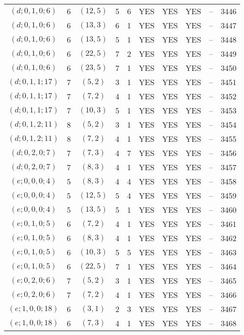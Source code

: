 \begin{longtable}{|c|c|c|c|c|c|c|c|c|c|}
$(d; 0, 1, 0; 6)$ & 6 & $(12, 5)$ & 5 & 6 & YES & YES & YES & -- & 3446\\
$(d; 0, 1, 0; 6)$ & 6 & $(13, 3)$ & 6 & 1 & YES & YES & YES & -- & 3447\\
$(d; 0, 1, 0; 6)$ & 6 & $(13, 5)$ & 5 & 1 & YES & YES & YES & -- & 3448\\
$(d; 0, 1, 0; 6)$ & 6 & $(22, 5)$ & 7 & 2 & YES & YES & YES & -- & 3449\\
$(d; 0, 1, 0; 6)$ & 6 & $(23, 5)$ & 7 & 1 & YES & YES & YES & -- & 3450\\
$(d; 0, 1, 1; 17)$ & 7 & $(5, 2)$ & 3 & 1 & YES & YES & YES & -- & 3451\\
$(d; 0, 1, 1; 17)$ & 7 & $(7, 2)$ & 4 & 1 & YES & YES & YES & -- & 3452\\
$(d; 0, 1, 1; 17)$ & 7 & $(10, 3)$ & 5 & 1 & YES & YES & YES & -- & 3453\\
$(d; 0, 1, 2; 11)$ & 8 & $(5, 2)$ & 3 & 1 & YES & YES & YES & -- & 3454\\
$(d; 0, 1, 2; 11)$ & 8 & $(7, 2)$ & 4 & 1 & YES & YES & YES & -- & 3455\\
$(d; 0, 2, 0; 7)$ & 7 & $(7, 3)$ & 4 & 7 & YES & YES & YES & -- & 3456\\
$(d; 0, 2, 0; 7)$ & 7 & $(8, 3)$ & 4 & 1 & YES & YES & YES & -- & 3457\\
$(e; 0, 0, 0; 4)$ & 5 & $(8, 3)$ & 4 & 4 & YES & YES & YES & -- & 3458\\
$(e; 0, 0, 0; 4)$ & 5 & $(12, 5)$ & 5 & 4 & YES & YES & YES & -- & 3459\\
$(e; 0, 0, 0; 4)$ & 5 & $(13, 5)$ & 5 & 1 & YES & YES & YES & -- & 3460\\
$(e; 0, 1, 0; 5)$ & 6 & $(7, 2)$ & 4 & 1 & YES & YES & YES & -- & 3461\\
$(e; 0, 1, 0; 5)$ & 6 & $(8, 3)$ & 4 & 1 & YES & YES & YES & -- & 3462\\
$(e; 0, 1, 0; 5)$ & 6 & $(10, 3)$ & 5 & 5 & YES & YES & YES & -- & 3463\\
$(e; 0, 1, 0; 5)$ & 6 & $(22, 5)$ & 7 & 1 & YES & YES & YES & -- & 3464\\
$(e; 0, 2, 0; 6)$ & 7 & $(5, 2)$ & 3 & 1 & YES & YES & YES & -- & 3465\\
$(e; 0, 2, 0; 6)$ & 7 & $(7, 2)$ & 4 & 1 & YES & YES & YES & -- & 3466\\
$(e; 1, 0, 0; 18)$ & 6 & $(3, 1)$ & 2 & 3 & YES & YES & YES & -- & 3467\\
$(e; 1, 0, 0; 18)$ & 6 & $(7, 3)$ & 4 & 1 & YES & YES & YES & -- & 3468\\

\end{longtable}
